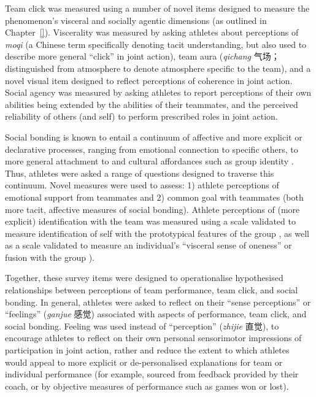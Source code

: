 \begin{CJK}{UTF8}{gbsn}
Team click was measured using a number of novel items designed to measure the phenomenon’s visceral and socially agentic dimensions (as outlined in Chapter~\ref{}).  Viscerality was measured by asking athletes about perceptions of \textit{moqi} (a Chinese term specifically denoting tacit understanding, but also used to describe more general ``click'' in joint action), team aura (\textit{qichang} 气场；distinguished from atmosphere to denote atmosphere specific to the team), and a novel visual item designed to reflect perceptions of coherence in joint action.  Social agency was measured by asking athletes to report perceptions of their own abilities being extended by the abilities of their teammates, and the perceived reliability of others (and self) to perform prescribed roles in joint action.

Social bonding is known to entail a continuum of affective and more explicit or declarative processes, ranging from emotional connection to specific others, to more general attachment to and cultural affordances such as group identity \citep{Dunbar2010,Whitehouse2014}.  Thus, athletes were asked a range of questions designed to traverse this continuum. Novel measures were used to assess: 1) athlete perceptions of emotional support from teammates and 2) common goal with teammates (both more tacit, affective measures of social bonding).  Athlete perceptions of (more explicit) identification with the team was measured using a scale validated to measure identification of self with the prototypical features of the group \citep[Group Identification, see][]{Turner1987}, as well as a scale validated to measure an individual’s ``visceral sense of oneness'' or fusion with the group \citep[Identity Fusion; see][]{Swann2009}).

Together, these survey items were designed to operationalise hypothesised relationships between perceptions of team performance, team click, and social bonding.  In general, athletes were asked to reflect on their ``sense perceptions'' or ``feelings'' (\textit{ganjue} 感觉) associated with aspects of performance, team click, and social bonding.  Feeling was used instead of ``perception'' (\textit{zhijie} 直觉), to encourage athletes to reflect on their own personal sensorimotor impressions of participation in joint action, rather and reduce the extent to which athletes would appeal to more explicit or de-personalised explanations for team or individual performance (for example, sourced from feedback provided by their coach, or by objective measures of performance such as games won or lost).


\end{CJK}
